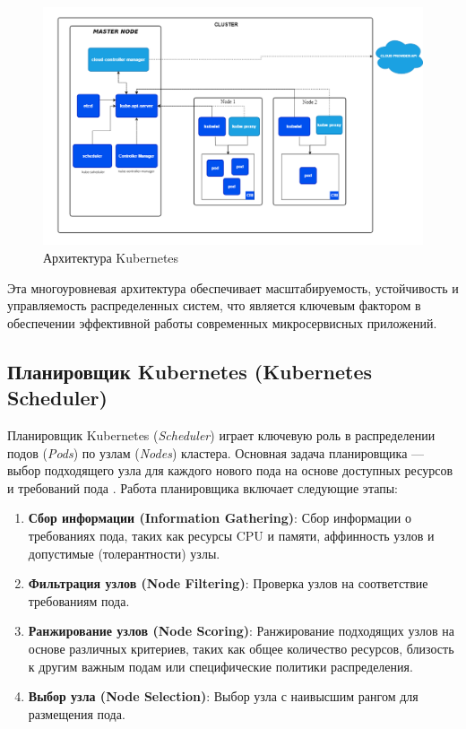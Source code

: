 \begin{figure}[h]
   \centering
   \includegraphics[scale=0.4]{img/8.png}
   \caption{Архитектура Kubernetes}
   \label{fig:ccg}
 \end{figure}

Эта многоуровневая архитектура обеспечивает масштабируемость, устойчивость и
управляемость распределенных систем, что является ключевым фактором в
обеспечении эффективной работы современных микросервисных приложений.

\subsection*{Планировщик Kubernetes (Kubernetes Scheduler)}

Планировщик Kubernetes (\textit{Scheduler}) играет ключевую роль в распределении
подов (\textit{Pods}) по узлам (\textit{Nodes}) кластера. Основная задача
планировщика — выбор подходящего узла для каждого нового пода на основе доступных
ресурсов и требований пода \cite{luksa2017kubernetes}.
Работа планировщика включает следующие этапы:

\begin{enumerate}
   \item \textbf{Сбор информации (Information Gathering)}: Сбор информации о
требованиях пода, таких как ресурсы CPU и памяти, аффинность узлов и
допустимые (толерантности) узлы.
   \item \textbf{Фильтрация узлов (Node Filtering)}: Проверка узлов на соответствие
требованиям пода.
   \item \textbf{Ранжирование узлов (Node Scoring)}: Ранжирование подходящих узлов
на основе различных критериев, таких как общее количество ресурсов, близость к
другим важным подам или специфические политики распределения.
   \item \textbf{Выбор узла (Node Selection)}: Выбор узла с наивысшим рангом
для размещения пода.
\end{enumerate}

